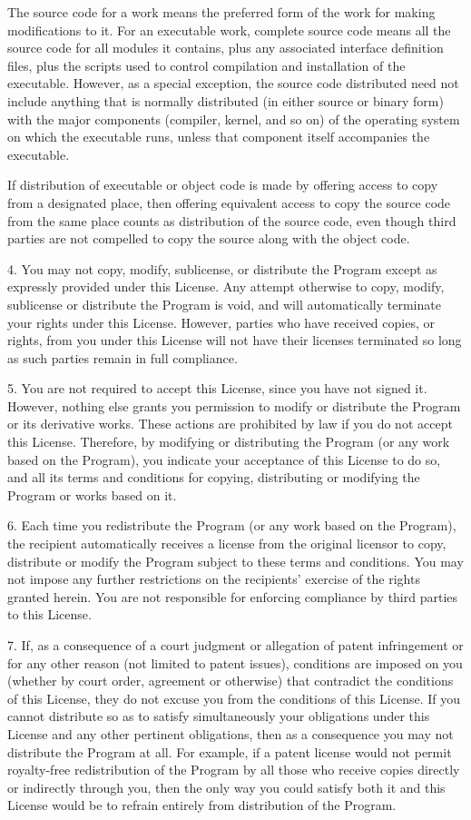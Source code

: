 The source code for a work means the preferred form of the work for
making modifications to it.  For an executable work, complete source
code means all the source code for all modules it contains, plus any
associated interface definition files, plus the scripts used to
control compilation and installation of the executable.  However, as a
special exception, the source code distributed need not include
anything that is normally distributed (in either source or binary
form) with the major components (compiler, kernel, and so on) of the
operating system on which the executable runs, unless that component
itself accompanies the executable.

If distribution of executable or object code is made by offering
access to copy from a designated place, then offering equivalent
access to copy the source code from the same place counts as
distribution of the source code, even though third parties are not
compelled to copy the source along with the object code.

  4. You may not copy, modify, sublicense, or distribute the Program
except as expressly provided under this License.  Any attempt
otherwise to copy, modify, sublicense or distribute the Program is
void, and will automatically terminate your rights under this License.
However, parties who have received copies, or rights, from you under
this License will not have their licenses terminated so long as such
parties remain in full compliance.

  5. You are not required to accept this License, since you have not
signed it.  However, nothing else grants you permission to modify or
distribute the Program or its derivative works.  These actions are
prohibited by law if you do not accept this License.  Therefore, by
modifying or distributing the Program (or any work based on the
Program), you indicate your acceptance of this License to do so, and
all its terms and conditions for copying, distributing or modifying
the Program or works based on it.

  6. Each time you redistribute the Program (or any work based on the
Program), the recipient automatically receives a license from the
original licensor to copy, distribute or modify the Program subject to
these terms and conditions.  You may not impose any further
restrictions on the recipients' exercise of the rights granted herein.
You are not responsible for enforcing compliance by third parties to
this License.

  7. If, as a consequence of a court judgment or allegation of patent
infringement or for any other reason (not limited to patent issues),
conditions are imposed on you (whether by court order, agreement or
otherwise) that contradict the conditions of this License, they do not
excuse you from the conditions of this License.  If you cannot
distribute so as to satisfy simultaneously your obligations under this
License and any other pertinent obligations, then as a consequence you
may not distribute the Program at all.  For example, if a patent
license would not permit royalty-free redistribution of the Program by
all those who receive copies directly or indirectly through you, then
the only way you could satisfy both it and this License would be to
refrain entirely from distribution of the Program.

